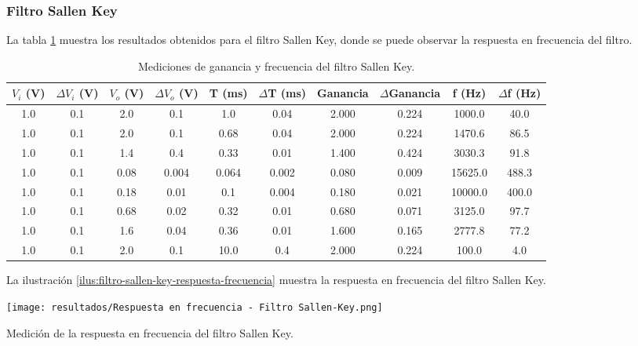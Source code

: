 \subsubsection{Filtro Sallen Key}

La tabla \ref{tab:filtro-sallen-key-ganancia-frecuencia} muestra los resultados obtenidos para el filtro Sallen Key, donde se puede observar la respuesta en frecuencia del filtro.

\begin{table}[h!]
    \centering
    \begin{tabular}{|c|c|c|c|c|c|c|c|c|c|}
        \hline
        $V_i$ (V) & $\Delta V_i$ (V) & $V_o$ (V) & $\Delta V_o$ (V) & T (ms) & $\Delta$T (ms) & Ganancia & $\Delta$Ganancia & f (Hz) & $\Delta$f (Hz) \\
        \hline
        1.0 & 0.1 & 2.0 & 0.1 & 1.0 & 0.04 & 2.000 & 0.224 & 1000.0 & 40.0 \\
        1.0 & 0.1 & 2.0 & 0.1 & 0.68 & 0.04 & 2.000 & 0.224 & 1470.6 & 86.5 \\
        1.0 & 0.1 & 1.4 & 0.4 & 0.33 & 0.01 & 1.400 & 0.424 & 3030.3 & 91.8 \\
        1.0 & 0.1 & 0.08 & 0.004 & 0.064 & 0.002 & 0.080 & 0.009 & 15625.0 & 488.3 \\
        1.0 & 0.1 & 0.18 & 0.01 & 0.1 & 0.004 & 0.180 & 0.021 & 10000.0 & 400.0 \\
        1.0 & 0.1 & 0.68 & 0.02 & 0.32 & 0.01 & 0.680 & 0.071 & 3125.0 & 97.7 \\
        1.0 & 0.1 & 1.6 & 0.04 & 0.36 & 0.01 & 1.600 & 0.165 & 2777.8 & 77.2 \\
        1.0 & 0.1 & 2.0 & 0.1 & 10.0 & 0.4 & 2.000 & 0.224 & 100.0 & 4.0 \\
        \hline
    \end{tabular}
    \caption{Mediciones de ganancia y frecuencia del filtro Sallen Key.}
    \label{tab:filtro-sallen-key-ganancia-frecuencia}
\end{table}

La ilustración \ref{ilus:filtro-sallen-key-respuesta-frecuencia} muestra la respuesta en frecuencia del filtro Sallen Key.


\begin{ilustracion}[h!]
    \centering
    \texttt{[image: resultados/Respuesta en frecuencia - Filtro Sallen-Key.png]}
    \caption{Medición de la respuesta en frecuencia del filtro Sallen Key.}
    \label{ilus:filtro-sallen-key-respuesta-frecuencia}
\end{ilustracion}


